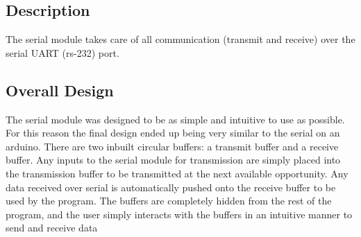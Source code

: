 \documentclass[]{report}
\begin{document}
\subsection{Description}
The serial module takes care of all communication (transmit and receive) over the serial UART (rs-232) port.

\subsection{Overall Design}
The serial module was designed to be as simple and intuitive to use as possible. For this reason the final design ended up being very similar to the serial on an arduino. \newline
There are two inbuilt circular buffers: a transmit buffer and a receive buffer. Any inputs to the serial module for transmission are simply placed into the transmission buffer to be transmitted at the next available opportunity. Any data received over serial is automatically pushed onto the receive buffer to be used by the program. \newline
The buffers are completely hidden from the rest of the program, and the user simply interacts with the buffers in an intuitive manner to send and receive data
\end{document}
